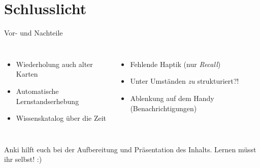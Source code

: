 \documentclass[aspectratio=169,compress]{beamer}
\begin{document}
\section{Schlusslicht}

\begin{frame}{Vor- und Nachteile}
	\begin{columns}
		\begin{itemize}
			\item Wiederholung auch alter Karten
			\item Automatische Lernstandserhebung
			\item Wissenskatalog über die Zeit
		\end{itemize}
		\begin{itemize}
			\item Fehlende Haptik (nur \textit{Recall})
			\item Unter Umständen \textit{zu} strukturiert?!
			\item Ablenkung auf dem Handy (Benachrichtigungen)
		\end{itemize}
	\end{columns} \par \pause
	Anki hilft euch bei der Aufbereitung und Präsentation des Inhalts. Lernen müsst ihr selbst! :)
\end{frame}
\end{document}
